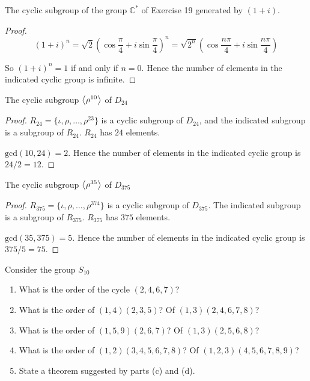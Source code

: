 \begin{exercise}
    The cyclic subgroup of the group $\mathbb{C}^{*}$ of Exercise 19 generated by $(1 + i)$.
\end{exercise}

\begin{proof}
    \[
        {(1 + i)}^{n} = {\sqrt{2}(\cos\frac{\pi}{4} + i\sin\frac{\pi}{4})}^{n} = \sqrt{2^{n}}(\cos\frac{n\pi}{4} + i\sin\frac{n\pi}{4})
    \]

    So ${(1 + i)}^{n} = 1$ if and only if $n = 0$. Hence the number of elements in the indicated cyclic group is infinite.
\end{proof}

\begin{exercise}
    The cyclic subgroup $\left\langle{\rho^{10}}\right\rangle$ of $D_{24}$
\end{exercise}

\begin{proof}
    $R_{24} = \{ \iota, \rho, \ldots, \rho^{23} \}$ is a cyclic subgroup of $D_{24}$, and the indicated subgroup is a subgroup of $R_{24}$. $R_{24}$ has $24$ elements.

    $\text{gcd}(10, 24) = 2$. Hence the number of elements in the indicated cyclic group is $24/2 = 12$.
\end{proof}

\begin{exercise}
    The cyclic subgroup $\left\langle{\rho^{35}}\right\rangle$ of $D_{375}$
\end{exercise}

\begin{proof}
    $R_{375} = \{ \iota, \rho, \ldots, \rho^{374} \}$ is a cyclic subgroup of $D_{375}$. The indicated subgroup is a subgroup of $R_{375}$. $R_{375}$ has $375$ elements.

    $\text{gcd}(35, 375) = 5$. Hence the number of elements in the indicated cyclic group is $375/5 = 75$.
\end{proof}

\begin{exercise}
    Consider the group $S_{10}$
    \begin{enumerate}[label={\textbf{\alph*.}}]
        \item What is the order of the cycle $(2, 4, 6, 7)$?
        \item What is the order of $(1, 4)(2, 3, 5)$? Of $(1, 3)(2, 4, 6, 7, 8)$?
        \item What is the order of $(1, 5, 9)(2, 6, 7)$? Of $(1, 3)(2, 5, 6, 8)$?
        \item What is the order of $(1, 2)(3, 4, 5, 6, 7, 8)$? Of $(1, 2, 3)(4, 5, 6, 7, 8, 9)$?
        \item State a theorem suggested by parts (c) and (d).
    \end{enumerate}
\end{exercise}

